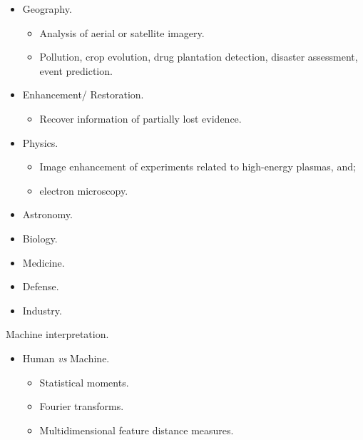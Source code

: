 \begin{frame}
\begin{itemize}
\item Geography.
\begin{itemize}
\item Analysis of aerial or satellite imagery.
\item Pollution, crop evolution, drug plantation detection, disaster assessment, event prediction.
\end{itemize}
\item Enhancement/ Restoration.
\begin{itemize}
\item Recover information of partially lost evidence.
\end{itemize}
\item Physics.
\begin{itemize}
\item Image enhancement of experiments related to high-energy plasmas, and;
\item electron microscopy.
\end{itemize}
\end{itemize}
\end{frame}


\begin{frame}
\begin{itemize}
\item Astronomy.
\item Biology.
\item Medicine.
\item Defense.
\item Industry.
\end{itemize}
\end{frame}


\begin{frame}
Machine interpretation.
\begin{itemize}
\item Human \textit{vs} Machine.
\begin{itemize}
\item Statistical moments.
\item Fourier transforms.
\item Multidimensional feature distance measures.
\end{itemize}
\end{itemize}
\end{frame}

